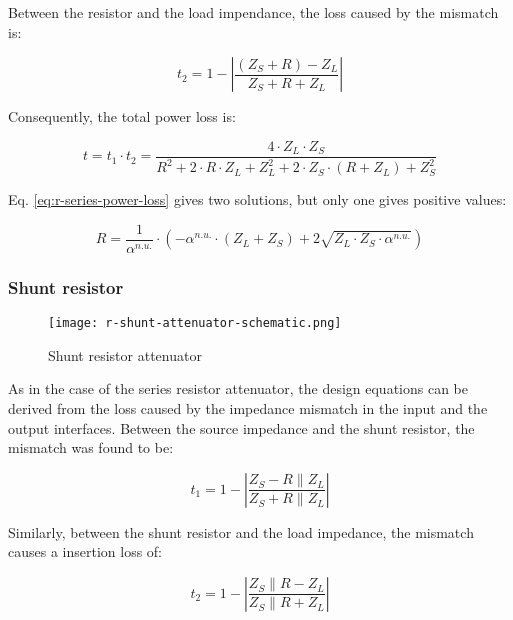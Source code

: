 \noindent Between the resistor and the load impendance, the loss caused by the mismatch is:

\begin{equation}
    t_2 = 1 - \left| \frac{(Z_S + R) - Z_L}{Z_S + R + Z_L}\right|
\end{equation}

\noindent Consequently, the total power loss is:

\begin{equation}
    t = t_1 \cdot t_2 = \frac{4 \cdot Z_L \cdot Z_S}{R^2 + 2 \cdot R \cdot Z_L + Z_L^2 + 2 \cdot Z_S \cdot (R  + Z_L) + Z_S^2}
    \label{eq:r-series-power-loss}
\end{equation}

\noindent Eq. \ref{eq:r-series-power-loss} gives two solutions, but only one gives positive values:

\begin{equation}
    R = \frac{1}{\alpha^{n.u.}} \cdot \left( -\alpha^{n.u.} \cdot (Z_L + Z_S) + 2 \sqrt{Z_L \cdot Z_S \cdot \alpha^{n.u.}} \right)
\end{equation}
\subsubsection{Shunt resistor}

\begin{figure}[ht]
    \centering
    \texttt{[image: r-shunt-attenuator-schematic.png]}
    \caption{Shunt resistor attenuator}
    \label{fig:r-shunt-attenuator-schematic}
\end{figure}

\noindent As in the case of the series resistor attenuator, the design equations can be derived from the loss caused by the impedance mismatch in the input and the output interfaces. Between the source impedance and the shunt resistor, the mismatch was found to be:

\begin{equation}
    t_1 = 1 - \left| \frac{Z_S - R \parallel Z_L}{Z_S + R \parallel Z_L} \right|
\end{equation}

\noindent Similarly, between the shunt resistor and the load impedance, the mismatch causes a insertion loss of:

\begin{equation}
    t_2 = 1 - \left| \frac{Z_S \parallel R - Z_L}{Z_S \parallel R + Z_L} \right|
\end{equation}

